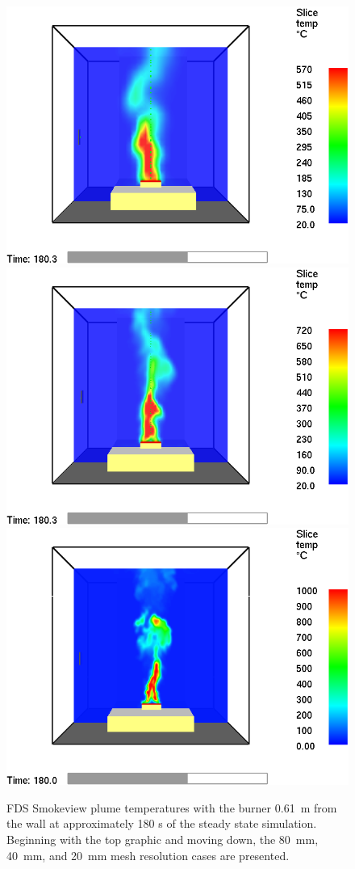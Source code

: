 \documentclass[twoside]{uocthesis}
\begin{document}
\begin{figure}[p]
	\centering
	\includegraphics[width=.625\columnwidth]{../Figures/NG_80kW_GBWall_2D_RI=05_0601T}\\
	\includegraphics[width=.625\columnwidth]{../Figures/NG_80kW_GBWall_2D_RI=10_601T}\\
	\includegraphics[width=.625\columnwidth]{../Figures/NG_80kW_GBWall_2D_RI=20_0600T}\\
	\caption[FDS Smokeview plume temperatures with the burner 0.61~m from the wall at approximately 180 s for the 80~mm, 40~mm, and 20~mm mesh resolution cases]{FDS Smokeview plume temperatures with the burner 0.61~m from the wall at approximately 180 s of the steady state simulation.  Beginning with the top graphic and moving down, the 80~mm, 40~mm, and 20~mm mesh resolution cases are presented.}
	\label{FDS_Plume_Temp_IWGB_Comp_}
\end{figure}
\end{document}
